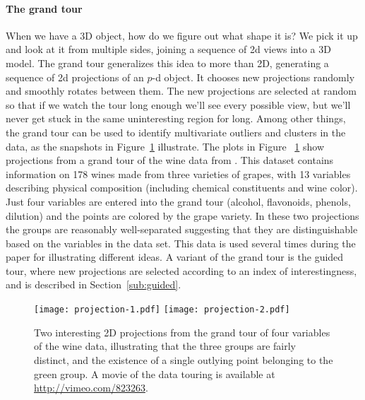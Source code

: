 \documentclass[preprint]{imsart}
\begin{document}
\paragraph{The grand tour} When we have a 3D object, how do we figure out what shape it is?  We pick it up and look at it from multiple sides, joining a sequence of 2d views into a 3D model.  The grand tour generalizes this idea to more than 2D, generating a sequence of 2d projections of an $p$-d object.  It chooses new projections randomly and smoothly rotates between them.  The new projections are selected at random so that if we watch the tour long enough we'll see every possible view, but we'll never get stuck in the same uninteresting region for long.  Among other things, the grand tour can be used to identify multivariate outliers and clusters in the data, as the snapshots in Figure~\ref{fig:projection} illustrate. The plots in Figure ~\ref{fig:projection} show projections from a grand tour of the wine data from \citet{asuncion:2007}. This dataset contains information on 178 wines made from three varieties of grapes, with 13 variables describing physical composition (including chemical constituents and wine color). Just four variables are entered into the grand tour (alcohol, flavonoids, phenols, dilution) and the points are colored by the grape variety. In these two projections the groups are reasonably well-separated suggesting that they are distinguishable based on the variables in the data set. This data is used several times during the paper for illustrating different ideas. A variant of the grand tour is the guided tour, where new projections are selected according to an index of interestingness, and is described in Section~\ref{sub:guided}.


\begin{figure}[htbp]
  \centering
    \texttt{[image: projection-1.pdf]}
    \texttt{[image: projection-2.pdf]}
    \caption{Two interesting 2D projections from the grand tour of
      four variables of the wine data, illustrating that the three
      groups are fairly distinct, and the existence of a single
      outlying point belonging to the green group.  A movie of the
      data touring is available at \url{http://vimeo.com/823263}.}
  \label{fig:projection}
\end{figure}
\end{document}
